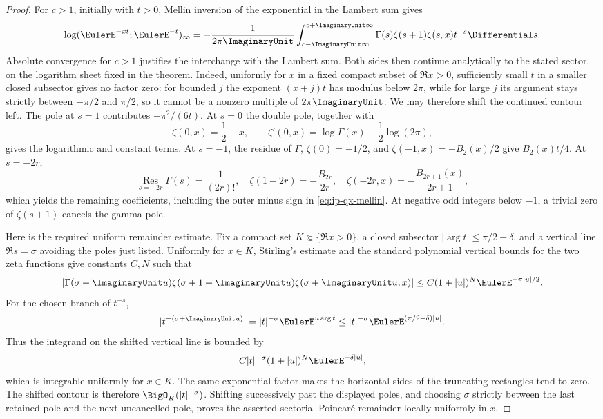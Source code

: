 \begin{proof}
For \(c>1\), initially with \(t>0\), Mellin inversion of the exponential in
the Lambert sum gives
\begin{equation}
 \log(\EulerE^{-xt};\EulerE^{-t})_\infty
 =-\frac1{2\pi\ImaginaryUnit}\int_{c-\ImaginaryUnit\infty}^{c+\ImaginaryUnit\infty}
 \Gamma(s)\zeta(s+1)\zeta(s,x)t^{-s}\Differential s.
 \label{eq:ip-qx-mellin}
\end{equation}
Absolute convergence for \(c>1\) justifies the interchange with the Lambert
sum.  Both sides then continue analytically to the stated sector, on the
logarithm sheet fixed in the theorem.  Indeed, uniformly for \(x\) in a fixed
compact subset of \(\Re x>0\), sufficiently small \(t\) in a smaller closed
subsector gives no factor zero: for bounded \(j\) the exponent
\((x+j)t\) has modulus below \(2\pi\), while for large \(j\) its argument
stays strictly between \(-\pi/2\) and \(\pi/2\), so it cannot be a nonzero
multiple of \(2\pi\ImaginaryUnit\).  We may therefore shift the continued contour left.
The pole at \(s=1\) contributes
\(-\pi^2/(6t)\).  At \(s=0\) the double pole, together with
\[
 \zeta(0,x)=\frac12-x,\qquad
 \zeta'(0,x)=\log\Gamma(x)-\frac12\log(2\pi),
\]
gives the logarithmic and constant terms.  At \(s=-1\), the residue of
\(\Gamma\), \(\zeta(0)=-1/2\), and
\(\zeta(-1,x)=-B_2(x)/2\) give \(B_2(x)t/4\).  At \(s=-2r\),
\[
 \operatorname*{Res}_{s=-2r}\Gamma(s)=\frac1{(2r)!},\quad
 \zeta(1-2r)=-\frac{B_{2r}}{2r},\quad
 \zeta(-2r,x)=-\frac{B_{2r+1}(x)}{2r+1},
\]
which yields the remaining coefficients, including the outer minus sign in
\cref{eq:ip-qx-mellin}.  At negative odd integers below \(-1\), a trivial zero
of \(\zeta(s+1)\) cancels the gamma pole.

Here is the required uniform remainder estimate.  Fix a compact set
\(K\Subset\{\Re x>0\}\), a closed subsector
\(|\arg t|\leq\pi/2-\delta\), and a vertical line \(\Re s=\sigma\) avoiding
the poles just listed.  Uniformly for \(x\in K\), Stirling's estimate and the
standard polynomial vertical bounds for the two zeta functions give constants
\(C,N\) such that
\[
 \left|\Gamma(\sigma+\ImaginaryUnit u)
 \zeta(\sigma+1+\ImaginaryUnit u)
 \zeta(\sigma+\ImaginaryUnit u,x)\right|
 \leq C(1+|u|)^N\EulerE^{-\pi|u|/2}.
\]
For the chosen branch of \(t^{-s}\),
\[
 |t^{-(\sigma+\ImaginaryUnit u)}|
 =|t|^{-\sigma}\EulerE^{u\arg t}
 \leq |t|^{-\sigma}\EulerE^{(\pi/2-\delta)|u|}.
\]
Thus the integrand on the shifted vertical line is bounded by
\[
 C|t|^{-\sigma}(1+|u|)^N\EulerE^{-\delta|u|},
\]
which is integrable uniformly for \(x\in K\).  The same exponential factor
makes the horizontal sides of the truncating rectangles tend to zero.  The
shifted contour is therefore \(\BigO_K(|t|^{-\sigma})\).  Shifting
successively past the displayed poles, and choosing \(\sigma\) strictly
between the last retained pole and the next uncancelled pole, proves the
asserted sectorial Poincaré remainder locally uniformly in \(x\).
\end{proof}

